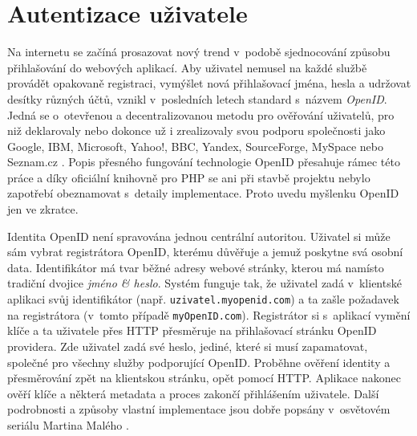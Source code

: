 \section{Autentizace uživatele}\label{openid}
Na internetu se začíná prosazovat nový trend v~podobě sjednocování
způsobu přihlašování do webových aplikací. Aby uživatel nemusel na každé
službě provádět opakovaně registraci, vymýšlet nová
přihlašovací jména, hesla a udržovat desítky různých účtů, vznikl
v~posledních letech standard s~názvem {\it OpenID}. Jedná se
o~otevřenou a decentralizovanou metodu pro ověřování uživatelů, pro niž
deklarovaly nebo dokonce už i zrealizovaly svou podporu společnosti
jako Google, IBM, Microsoft, Yahoo!, BBC, Yandex, SourceForge, MySpace
nebo Seznam.cz \cite{dataportability}. Popis přesného fungování technologie
OpenID přesahuje rámec této práce a díky oficiální knihovně pro PHP
se ani při stavbě projektu nebylo zapotřebí obeznamovat s~detaily
implementace. Proto uvedu myšlenku OpenID jen ve zkratce.

Identita OpenID není spravována jednou centrální autoritou. Uživatel
si může sám vybrat registrátora OpenID, kterému důvěřuje a jemuž
poskytne svá osobní data. Identifikátor má tvar běžné adresy webové
stránky, kterou má namísto tradiční dvojice {\it jméno \& heslo}.
Systém funguje tak, že uživatel zadá v~klientské aplikaci svůj
identifikátor (např. {\tt uzivatel.myopenid.com}) a ta zašle
požadavek na registrátora (v~tomto případě {\tt myOpenID.com}).
Registrátor si s~aplikací vymění klíče a ta uživatele přes HTTP
přesměruje na přihlašovací stránku OpenID providera. Zde uživatel
zadá své heslo, jediné, které si musí zapamatovat, společné pro
všechny služby podporující OpenID. Proběhne ověření identity a
přesměrování zpět na klientskou stránku, opět pomocí HTTP. Aplikace
nakonec ověří klíče a některá metadata a proces zakončí přihlášením
uživatele. Další podrobnosti a způsoby vlastní implementace jsou
dobře popsány v~osvětovém seriálu Martina Malého \cite{openid}.

